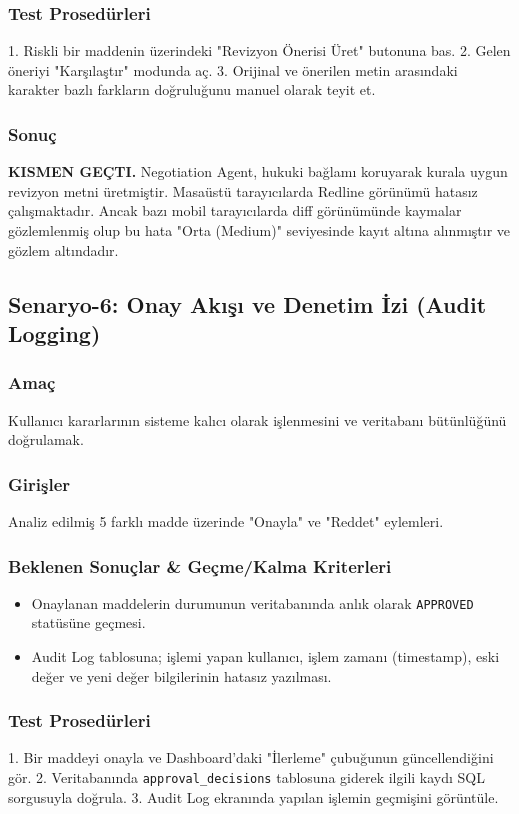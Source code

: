 \documentclass[12pt,a4paper]{article}
\begin{document}
\subsubsection{Test Prosedürleri}
1. Riskli bir maddenin üzerindeki "Revizyon Önerisi Üret" butonuna bas. 
2. Gelen öneriyi "Karşılaştır" modunda aç. 
3. Orijinal ve önerilen metin arasındaki karakter bazlı farkların doğruluğunu manuel olarak teyit et.

\subsubsection{Sonuç}
\textbf{KISMEN GEÇTI.} Negotiation Agent, hukuki bağlamı koruyarak kurala uygun revizyon metni üretmiştir. Masaüstü tarayıcılarda Redline görünümü hatasız çalışmaktadır. Ancak bazı mobil tarayıcılarda diff görünümünde kaymalar gözlemlenmiş olup bu hata "Orta (Medium)" seviyesinde kayıt altına alınmıştır ve gözlem altındadır.

\subsection{Senaryo-6: Onay Akışı ve Denetim İzi (Audit Logging)}
\subsubsection{Amaç}
Kullanıcı kararlarının sisteme kalıcı olarak işlenmesini ve veritabanı bütünlüğünü doğrulamak.

\subsubsection{Girişler}
Analiz edilmiş 5 farklı madde üzerinde "Onayla" ve "Reddet" eylemleri.

\subsubsection{Beklenen Sonuçlar \& Geçme/Kalma Kriterleri}
\begin{itemize}
    \item Onaylanan maddelerin durumunun veritabanında anlık olarak \texttt{APPROVED} statüsüne geçmesi.
    \item Audit Log tablosuna; işlemi yapan kullanıcı, işlem zamanı (timestamp), eski değer ve yeni değer bilgilerinin hatasız yazılması.
\end{itemize}

\subsubsection{Test Prosedürleri}
1. Bir maddeyi onayla ve Dashboard'daki "İlerleme" çubuğunun güncellendiğini gör. 
2. Veritabanında \texttt{approval\_decisions} tablosuna giderek ilgili kaydı SQL sorgusuyla doğrula. 
3. Audit Log ekranında yapılan işlemin geçmişini görüntüle.
\end{document}
